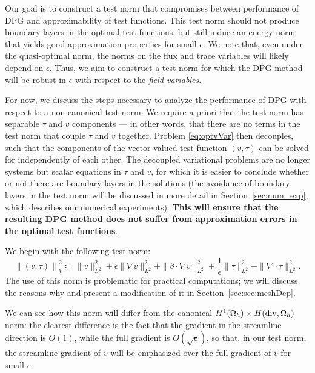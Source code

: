 \documentclass[11pt,onecolumn]{scrartcl}
\newcommand{\eqnref}[1]{\eqref{eq:#1}}
\newcommand{\secref}[1]{\ref{sec:#1}}
\newcommand{\grad}{\nabla}
\renewcommand{\div}{\grad \cdot}
\begin{document}
Our goal is to construct a test norm that compromises between performance of DPG and approximability of test functions.  This test norm should not produce boundary layers in the optimal test functions, but still induce an energy norm that yields good approximation properties for small $\epsilon$. We note that, even under the quasi-optimal norm, the norms on the flux and trace variables will likely depend on $\epsilon$. Thus, we aim to construct a test norm for which the DPG method will be robust in $\epsilon$ with respect to the \emph{field variables}. 

For now, we discuss the steps necessary to analyze the performance of DPG with respect to a non-canonical test norm. We require a priori that the test norm has separable $\tau$ and $v$ components --- in other words, that there are no terms in the test norm that couple $\tau$ and $v$ together. Problem \eqnref{optvVar} then decouples, such that the components of the vector-valued test function $\left(v,\tau\right)$ can be solved for independently of each other. The decoupled variational problems are no longer systems but scalar equations in $\tau$ and $v$, for which it is easier to conclude whether or not there are boundary layers in the solutions (the avoidance of boundary layers in the test norm will be discussed in more detail in Section~\ref{sec:num_exp}, which describes our numerical experiments). \textbf{This will ensure that the resulting DPG method does not suffer from approximation errors in the optimal test functions}.

We begin with the following test norm:
\[
\left\|\left(v,\tau\right)\right\|^2_V \coloneqq \|v\|_{L^2}^2 + \epsilon\|\grad v\|_{L^2}^2 + \|\beta \cdot \grad v\|_{L^2}^2  + \frac{1}{\epsilon}\|\tau\|_{L^2}^2 + \|\div \tau\|_{L^2}^2.
\]
The use of this norm is problematic for practical computations; we will discuss the reasons why and present a modification of it in Section~\secref{sec:meshDep}. 

We can see how this norm will differ from the canonical $H^1(\Omega_h)\times H({\rm div},\Omega_h)$ norm: the clearest difference is the fact that the gradient in the streamline direction is $O(1)$, while the full gradient is $O(\sqrt{\epsilon})$, so that, in our test norm, the streamline gradient of $v$ will be emphasized over the full gradient of $v$ for small $\epsilon$. 
\end{document}
